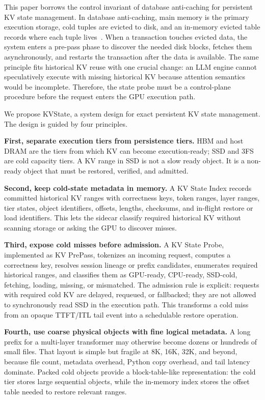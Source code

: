 \documentclass[sigconf,review,anonymous]{acmart}
\newcommand{\system}{KVState\xspace}
\begin{document}
This paper borrows the control invariant of database anti-caching for persistent
KV state management. In database anti-caching, main memory is the primary
execution storage, cold tuples are evicted to disk, and an in-memory evicted
table records where each tuple lives~\citep{debrabant2013anticaching}. When a
transaction touches evicted data, the system enters a pre-pass phase to discover
the needed disk blocks, fetches them asynchronously, and restarts the transaction
after the data is available. The same principle fits historical KV reuse with
one crucial change: an LLM engine cannot speculatively execute with missing
historical KV because attention semantics would be incomplete. Therefore, the
state probe must be a control-plane procedure before the request enters the GPU
execution path.

We propose \system, a system design for exact persistent KV state management.
The design is guided by four principles.

\textbf{First, separate execution tiers from persistence tiers.} HBM and host
DRAM are the tiers from which KV can become execution-ready; SSD and 3FS are
cold capacity tiers. A KV range in SSD is not a slow ready object. It is a
non-ready object that must be restored, verified, and admitted.

\textbf{Second, keep cold-state metadata in memory.} A KV State Index records
committed historical KV ranges with correctness keys, token ranges, layer
ranges, tier states, object identifiers, offsets, lengths, checksums, and
in-flight restore or load identifiers. This lets the sidecar classify required
historical KV without scanning storage or asking the GPU to discover misses.

\textbf{Third, expose cold misses before admission.} A KV State Probe,
implemented as KV PrePass, tokenizes an incoming request, computes a correctness
key, resolves session lineage or prefix candidates, enumerates required
historical ranges, and classifies them as GPU-ready, CPU-ready, SSD-cold,
fetching, loading, missing, or mismatched. The admission rule is explicit:
requests with required cold KV are delayed, requeued, or fallbacked; they are not
allowed to synchronously read SSD in the execution path. This transforms a cold
miss from an opaque TTFT/ITL tail event into a schedulable restore operation.

\textbf{Fourth, use coarse physical objects with fine logical metadata.} A long
prefix for a multi-layer transformer may otherwise become dozens or hundreds of
small files. That layout is simple but fragile at 8K, 16K, 32K, and beyond,
because file count, metadata overhead, Python copy overhead, and tail latency
dominate. Packed cold objects provide a block-table-like representation: the
cold tier stores large sequential objects, while the in-memory index stores the
offset table needed to restore relevant ranges.
\end{document}
